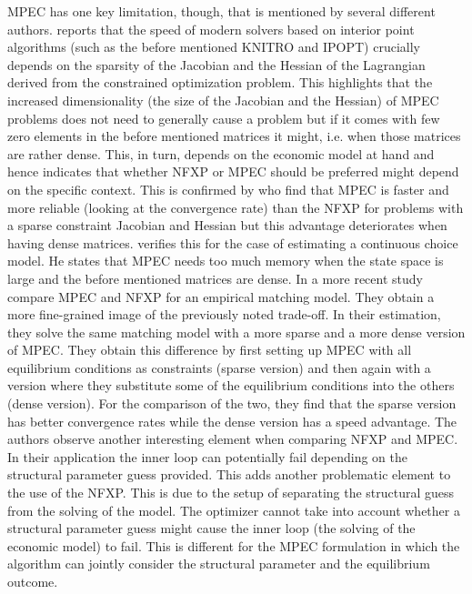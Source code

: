 MPEC has one key limitation, though, that is mentioned by several different authors. \cite{Wright.2004} reports that the speed of modern solvers based on interior point algorithms (such as the before mentioned KNITRO and IPOPT) crucially depends on the sparsity of the Jacobian and the Hessian of the Lagrangian derived from the constrained optimization problem. This highlights that the increased dimensionality (the size of the Jacobian and the Hessian) of MPEC problems does not need to generally cause a problem but if it comes with few zero elements in the before mentioned matrices it might, i.e. when those matrices are rather dense. This, in turn, depends on the economic model at hand and hence indicates that whether NFXP or MPEC should be preferred might depend on the specific context. This is confirmed by \citeauthor{Dube.Fox.Su.2012} who find that MPEC is faster and more reliable (looking at the convergence rate) than the NFXP for problems with a sparse constraint Jacobian and Hessian but this advantage deteriorates when having dense matrices. \cite{Jorgensen.2013} verifies this for the case of estimating a continuous choice model. He states that MPEC needs too much memory when the state space is large and the before mentioned matrices are dense. In a more recent study \cite{Dong.Hsieh.Zhang.2017} compare MPEC and NFXP for an empirical matching model. They obtain a more fine-grained image of the previously noted trade-off. In their estimation, they solve the same matching model with a more sparse and a more dense version of MPEC. They obtain this difference by first setting up MPEC with all equilibrium conditions as constraints (sparse version) and then again with a version where they substitute some of the equilibrium conditions into the others (dense version). For the comparison of the two, they find that the sparse version has better convergence rates while the dense version has a speed advantage. The authors observe another interesting element when comparing NFXP and MPEC. In their application the inner loop can potentially fail depending on the structural parameter guess provided. This adds another problematic element to the use of the NFXP. This is due to the setup of separating the structural guess from the solving of the model. The optimizer cannot take into account whether a structural parameter guess might cause the inner loop (the solving of the economic model) to fail. This is different for the MPEC formulation in which the algorithm can jointly consider the structural parameter and the equilibrium outcome.



